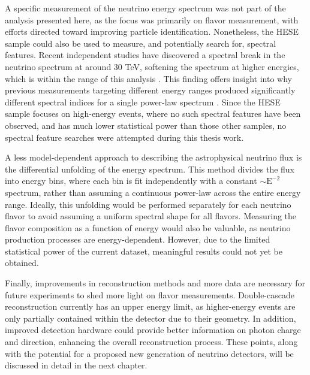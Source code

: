 A specific measurement of the neutrino energy spectrum was not part of the analysis presented here, as the focus was primarily on flavor measurement, with efforts directed toward improving particle identification. Nonetheless, the HESE sample could also be used to measure, and potentially search for, spectral features. Recent independent studies have discovered a spectral break in the neutrino spectrum at around 30 TeV, softening the spectrum at higher energies, which is within the range of this analysis . This finding offers insight into why previous measurements targeting different energy ranges produced significantly different spectral indices for a single power-law spectrum . Since the HESE sample focuses on high-energy events, where no such spectral features have been observed, and has much lower statistical power than those other samples, no spectral feature searches were attempted during this thesis work.

A less model-dependent approach to describing the astrophysical neutrino flux is the differential unfolding of the energy spectrum. This method divides the flux into energy bins, where each bin is fit independently with a constant $\sim\mathrm{E}^{-2}$ spectrum, rather than assuming a continuous power-law across the entire energy range. Ideally, this unfolding would be performed separately for each neutrino flavor to avoid assuming a uniform spectral shape for all flavors. Measuring the flavor composition as a function of energy would also be valuable, as neutrino production processes are energy-dependent. However, due to the limited statistical power of the current dataset, meaningful results could not yet be obtained.

Finally, improvements in reconstruction methods and more data are necessary for future experiments to shed more light on flavor measurements. Double-cascade reconstruction currently has an upper energy limit, as higher-energy events are only partially contained within the detector due to their geometry. In addition, improved detection hardware could provide better information on photon charge and direction, enhancing the overall reconstruction process. These points, along with the potential for a proposed new generation of neutrino detectors, will be discussed in detail in the next chapter. 


